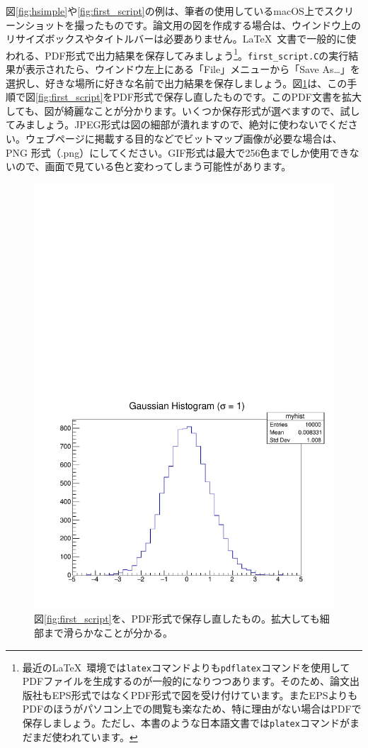 {図\ref{fig:hsimple}や\ref{fig:first_script}の例は、筆者の使用しているmacOS上でスクリーンショットを撮ったものです。論文用の図を作成する場合は、ウインドウ上のリサイズボックスやタイトルバーは必要ありません。\LaTeX\ 文書で一般的に使われる、PDF形式で出力結果を保存してみましょう\footnote{最近の\LaTeX\ 環境では\texttt{latex}コマンドよりも\texttt{pdflatex}コマンドを使用してPDFファイルを生成するのが一般的になりつつあります。そのため、論文出版社もEPS形式ではなくPDF形式で図を受け付けています。またEPSよりもPDFのほうがパソコン上での閲覧も楽なため、特に理由がない場合はPDFで保存しましょう。ただし、本書のような日本語文書では\texttt{platex}コマンドがまだまだ使われています。}。\texttt{first\_script.C}の実行結果が表示されたら、ウインドウ左上にある「File」メニューから「Save As\ldots」を選択し、好きな場所に好きな名前で出力結果を保存しましょう。図\ref{fig:first_script_pdf}は、この手順で図\ref{fig:first_script}をPDF形式で保存し直したものです。このPDF文書を拡大しても、図が綺麗なことが分かります。いくつか保存形式が選べますので、試してみましょう。JPEG形式は図の細部が潰れますので、絶対に使わないでください。ウェブページに掲載する目的などでビットマップ画像が必要な場合は、PNG 形式（.png）にしてください。GIF形式は最大で256色までしか使用できないので、画面で見ている色と変わってしまう可能性があります。

\begin{figure}
  \centering
  \includegraphics[width=12cm,clip]{fig/first_script_pdf.pdf}
  \caption{図\ref{fig:first_script}を、PDF形式で保存し直したもの。拡大しても細部まで滑らかなことが分かる。}
  \label{fig:first_script_pdf}
\end{figure}

}
